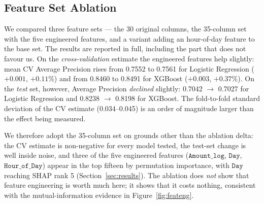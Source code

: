\subsection{Feature Set Ablation}
\label{sec:preprocess}

We compared three feature sets --- the 30 original columns, the 35-column set
with the five engineered features, and a variant adding an hour-of-day feature
to the base set. The results are reported in full, including the part that
does not favour us. On the \emph{cross-validation} estimate the engineered
features help slightly: mean CV Average Precision rises from 0.7552 to 0.7561
for Logistic Regression ($+0.001$, $+0.11\%$) and from 0.8460 to 0.8491 for
XGBoost ($+0.003$, $+0.37\%$). On the \emph{test} set, however, Average
Precision \emph{declined} slightly: 0.7042 $\rightarrow$ 0.7027 for Logistic
Regression and 0.8238 $\rightarrow$ 0.8198 for XGBoost. The fold-to-fold
standard deviation of the CV estimate (0.034--0.045) is an order of magnitude
larger than the effect being measured.

We therefore adopt the 35-column set on grounds other than the ablation
delta: the CV estimate is non-negative for every model tested, the test-set
change is well inside noise, and three of the five engineered features
($\texttt{Amount\_log}$, $\texttt{Day}$, $\texttt{Hour\_of\_Day}$) appear in
the top fifteen by permutation importance, with $\texttt{Day}$ reaching SHAP
rank 5 (Section~\ref{sec:results}). The ablation does \emph{not} show that
feature engineering is worth much here; it shows that it costs nothing,
consistent with the mutual-information evidence in
Figure~\ref{fig:feateng}.
